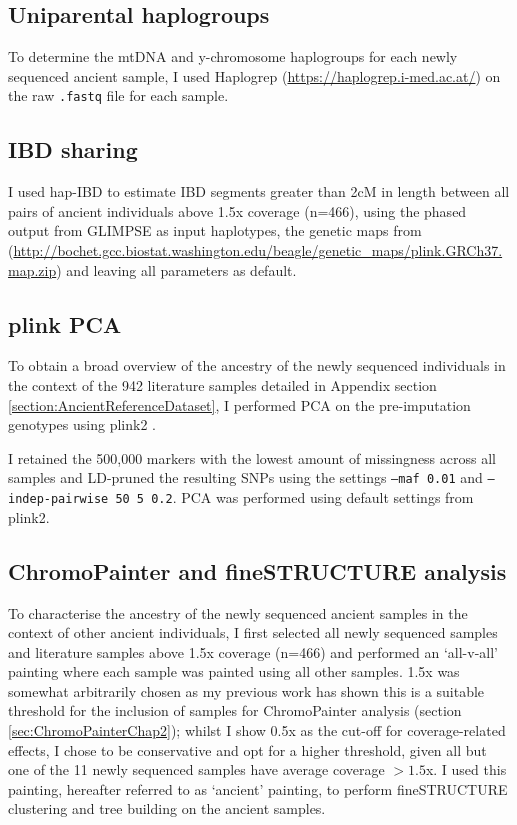 \subsection{Uniparental haplogroups}

To determine the mtDNA and y-chromosome haplogroups for each newly sequenced ancient sample, I used Haplogrep (\url{https://haplogrep.i-med.ac.at/}) \cite{weissensteiner2016haplogrep} on the raw \texttt{.fastq} file for each sample. 

\subsection{IBD sharing}

I used hap-IBD \cite{zhou2020fast} to estimate IBD segments greater than 2cM in length between all pairs of ancient individuals above 1.5x coverage (n=466), using the phased output from GLIMPSE as input haplotypes, the genetic maps  from (\url{http://bochet.gcc.biostat.washington.edu/beagle/genetic_maps/plink.GRCh37.map.zip}) and leaving all parameters as default. 

\subsection{plink PCA}

To obtain a broad overview of the ancestry of the newly sequenced individuals in the context of the 942 literature samples detailed in Appendix section \ref{section:AncientReferenceDataset}, I performed PCA on the pre-imputation genotypes using plink2 \cite{chang2015second}. 

I retained the 500,000 markers with the lowest amount of missingness across all samples and LD-pruned the resulting SNPs using the settings \texttt{--maf 0.01} and \texttt{--indep-pairwise 50 5 0.2}. PCA was performed using default settings from plink2.

\subsection{ChromoPainter and fineSTRUCTURE analysis}

To characterise the ancestry of the newly sequenced ancient samples in the context of other ancient individuals, I first selected all newly sequenced samples and literature samples above 1.5x coverage (n=466) and performed an `all-v-all' painting where each sample was painted using all other samples. 1.5x was somewhat arbitrarily chosen as my previous work has shown this is a suitable threshold for the inclusion of samples for ChromoPainter analysis (section \ref{sec:ChromoPainterChap2}); whilst I show 0.5x as the cut-off for coverage-related effects, I chose to be conservative and opt for a higher threshold, given all but one of the 11 newly sequenced samples have average coverage $>1.5$x. I used this painting, hereafter referred to as `ancient' painting, to perform fineSTRUCTURE clustering and tree building on the ancient samples. 

